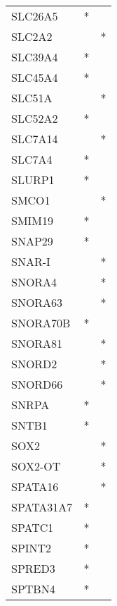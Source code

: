 \begin{longtable}{lcc}
SLC26A5          &              * &            \\
SLC2A2           &                &          * \\
SLC39A4          &              * &            \\
SLC45A4          &              * &            \\
SLC51A           &                &          * \\
SLC52A2          &              * &            \\
SLC7A14          &                &          * \\
SLC7A4           &              * &            \\
SLURP1           &              * &            \\
SMCO1            &                &          * \\
SMIM19           &              * &            \\
SNAP29           &              * &            \\
SNAR-I           &                &          * \\
SNORA4           &                &          * \\
SNORA63          &                &          * \\
SNORA70B         &              * &            \\
SNORA81          &                &          * \\
SNORD2           &                &          * \\
SNORD66          &                &          * \\
SNRPA            &              * &            \\
SNTB1            &              * &            \\
SOX2             &                &          * \\
SOX2-OT          &                &          * \\
SPATA16          &                &          * \\
SPATA31A7        &              * &            \\
SPATC1           &              * &            \\
SPINT2           &              * &            \\
SPRED3           &              * &            \\
SPTBN4           &              * &            \\

\end{longtable}
